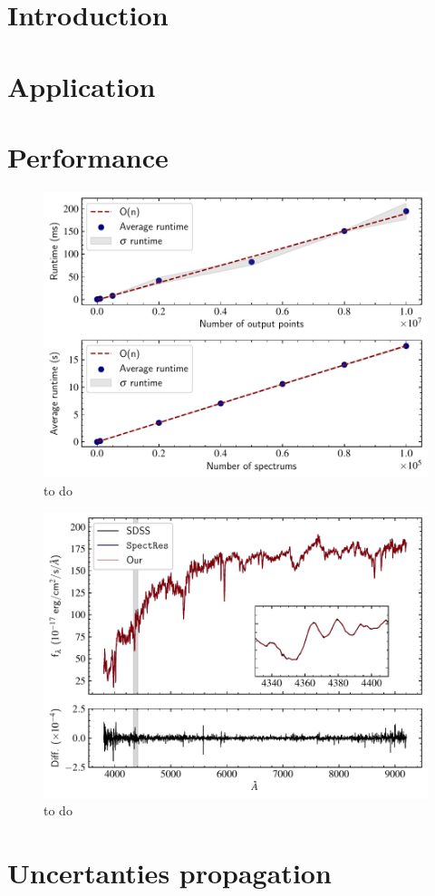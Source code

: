\documentclass[12pt, letterpaper, twoside]{article}
\begin{document}
\section{Introduction}


\citet{spectres+17}
\section{Application}
\section{Performance}

\begin{figure}[h]
	\label{fig:perf}
	\centering
	\includegraphics[width = \linewidth]{runtime.pdf}
	\caption{to do}
\end{figure}

\begin{figure}[h]
	\label{fig:perf}
	\centering
	\includegraphics[width = \linewidth]{comparison.pdf}
	\caption{to do}
\end{figure}

\section{Uncertanties propagation}


\end{document}
